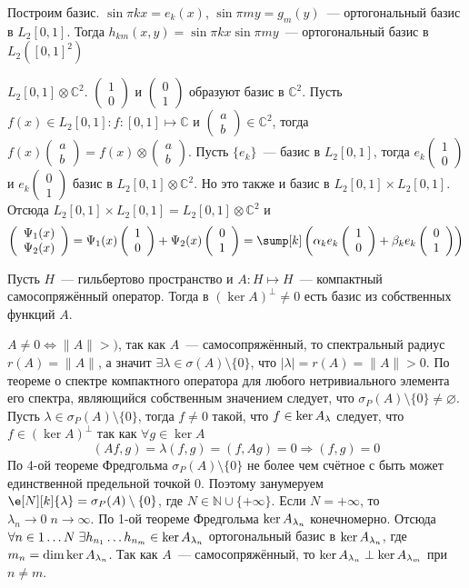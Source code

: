 \documentclass[14pt]{extarticle}
\newcommand{\vect}[2]{\left(
\begin{array}{c}
    #1\\
    #2
\end{array}\right)}
\begin{document}
Построим базис.
$\sin \pi k x = e_k(x)$, $\sin \pi m y = g_m(y)$~--- ортогональный базис в $L_2[0,1]$.
Тогда $h_{km}(x,y) = \sin \pi k x \sin \pi m y$~--- ортогональный базис в $L_2
([0,1]^2)$
\begin{Prim}
$L_2[0,1] \otimes \mathbb C^2$. $\vect{1}{0}$ и $\vect{0}{1}$ образуют базис в 
$\mathbb C^2$.
Пусть $f(x) \in L_2[0,1]\colon f : [0,1] \mapsto \mathbb C$ и $\vect{a}{b} \in 
\mathbb{C}^2$, тогда $f(x)\vect{a}{b} = f(x) \otimes \vect{a}{b}$.
Пусть $\{e_k\}$~--- базис в $L_2[0,1]$, тогда $e_k \vect{1}{0}$ и $e_k\vect{0}{1}$
базис в $L_2[0,1] \otimes \mathbb C^2$. Но это также и базис в $L_2[0,1] \times
L_2[0,1]$. Отсюда $L_2[0,1] \times L_2[0,1] = L_2[0,1] \otimes \mathbb C^2$ и
$$
\vect{\Psi_1(x)}{\Psi_2(x)} = \Psi_1(x) \vect{1}{0} + \Psi_2(x) \vect{0}{1} =
\sump[k]\left(\alpha_k e_k \vect{1}{0} + \beta_k e_k \vect{0}{1}\right)
$$
\end{Prim}
\begin{Theor}
    Пусть $H$~--- гильбертово пространство и $A : H \mapsto H$~--- компактный
    самосопряжённый оператор. Тогда в $(\ker A)^\perp \ne 0$ есть базис 
    из собственных функций $A$.
\end{Theor}
\begin{Proof}
    $A \ne 0 \Leftrightarrow \|A\| > )$, так как $A$~--- самосопряжённый, то 
    спектральный радиус $r(A) = \|A\|$, а значит $\exists \lambda \in \sigma(A)
    \setminus\{0\}$, что $|\lambda| = r(A) = \|A\| > 0$.
    По теореме о спектре компактного оператора для любого нетривиального
    элемента его спектра, являющийся собственным значением следует, что
    $\sigma_P(A) \setminus\{0\} \ne \varnothing$. Пусть $\lambda \in \sigma_P(A)
    \setminus\{0\}$, тогда $f \ne 0$ такой, что $f \in \ker \Al$ следует, что
    $f \in (\ker A)^\perp$ так как $\forall g \in \ker A$
    $$
    (Af, g) = \lambda(f, g) = (f, Ag) = 0 \Rightarrow (f, g) = 0
    $$
    По 4-ой теореме Фредгольма $\sigma_P(A)\setminus\{0\}$ не более чем 
    счётное с быть может единственной предельной точкой 0. Поэтому 
    занумеруем $\e[N][k]{\lambda} = \sigma_P(A) \setminus\{0\}$, где $N 
    \in \mathbb N \cup \{+\infty\}$. Если $N = +\infty$, то $\lambda_n \to 0\;n \to
    \infty$.
    По 1-ой теореме Фредгольма $\ker \Al[n]$ конечномерно.
    Отсюда $\forall n \in 1 \dots N\; \exists h_{n_1}\dots h_{n_m} \in \ker \Al[n]$
    ортогональный базис в $\ker \Al[n]$, где $m_n = \dim \ker \Al[n]$.
    Так как $A$~--- самосопряжённый, то $\ker \Al[n] \perp \ker \Al[m]$ при $n \ne 
    m$.
\end{Proof}
\end{document}
